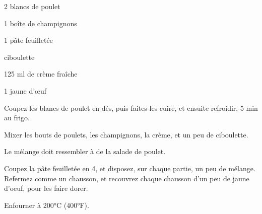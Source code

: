 


\totaltime{}


\begin{ingredients}
    \item 2 blancs de poulet
    \item 1 boîte de champignons
    \item 1 pâte feuilletée
    \item ciboulette
    \item 125 ml de crème fraîche
    \item 1 jaune d’œuf
\end{ingredients}

\begin{steps}
    \item Coupez les blancs de poulet en dés, puis faites-les cuire, et ensuite refroidir, 5 min au frigo.
    \item Mixer les bouts de poulets, les champignons, la crème, et un peu de ciboulette.
    \item Le mélange doit ressembler à de la salade de poulet.
    \item Coupez la pâte feuilletée en 4, et disposez, sur chaque partie, un peu de mélange. Refermez comme un chausson, et recouvrez chaque chausson d'un peu de jaune d'oeuf, pour les faire dorer.
    \item Enfourner à 200°C (400°F).
\end{steps}
